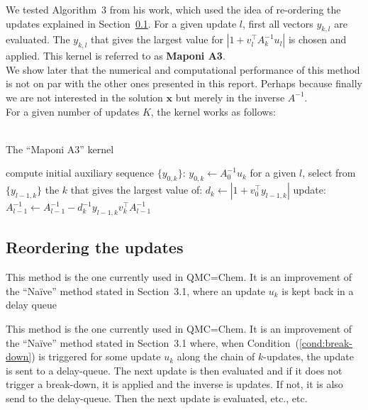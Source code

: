 \documentclass[11pt]{article}
\numberwithin{figure}{section}
\numberwithin{table}{section}
\begin{document}
				We tested Algorithm~3 from his work, which used the idea of re-ordering the updates explained in Section~\ref{sec:reordering}. For a given update $l$, first all vectors $y_{k,l}$ are evaluated. The $y_{k,l}$ that gives the largest value for $\left|1+v_l^\top A_k^{-1}u_l\right|$ is chosen and applied.  This kernel is referred to as \textbf{Maponi A3}.\\
				
				We show later that the numerical and computational performance of this method is not on par with the other ones presented in this report. Perhaps because finally we are not interested in the solution $\mathbf{x}$ but merely in the inverse $A^{-1}$.\\
				
				For a given number of updates $K$, the kernel works as follows:\\
				\\
				\begin{algorithm}[H]
				\caption{The ``Maponi A3'' kernel}\label{algo:ma3}
				 {
					compute initial auxiliary sequence $\{y_{0,k}\}$: $y_{0,k} \gets A^{-1}_{0}u_k$\;
				}
				 {
					for a given $l$, select from $\{y_{l-1,k}\}$
					the $k$ that gives the largest value of:
					$d_k \gets \left|1+v_0^\top y_{l-1,k}\right|$\;
					update: $A^{-1}_{l-1} \gets A^{-1}_{l-1} - d_k^{-1}y_{l-1,k}v_k^\top A^{-1}_{l-1}$\;
				}
				\end{algorithm}
							
			\subsection{Reordering the updates}\label{sec:reordering}

				This method is the one currently used in QMC=Chem. It is an improvement of the ``Na\"{i}ve'' method stated in Section~3.1, where an update $u_k$ is kept back in a delay queue 

				This method is the one currently used in QMC=Chem. It is an improvement of the ``Na\"{i}ve'' method stated in Section~3.1 where, when Condition~(\ref{cond:break-down}) is triggered for some update $u_k$ along the chain of $k$-updates, the update is sent to a delay-queue. The next update is then evaluated and if it does not trigger a break-down, it is applied and the inverse is updates. If not, it is also send to the delay-queue. Then the next update is evaluated, etc., etc.\\
				
\end{document}
